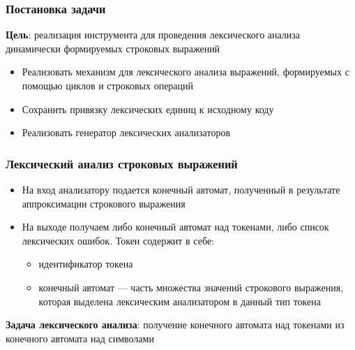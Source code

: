 \documentclass{beamer}
\begin{document}
\begin{frame}[fragile]
\transwipe[direction=90]
\frametitle{Постановка задачи}

\textbf{Цель}: реализация инструмента для проведения лексического анализа динамически формируемых строковых выражений

\begin{itemize}
\item Реализовать механизм для лексического анализа выражений, формируемых с помощью циклов и строковых операций%
\item Сохранить привязку лексических единиц к исходному коду
\item Реализовать генератор лексических анализаторов
\end{itemize}

\end{frame}

\begin{frame}
\transwipe[direction=90]
\frametitle{Лексический анализ строковых выражений}
\begin{itemize}
\item На вход анализатору подается конечный автомат, полученный в результате аппроксимации строкового выражения
\item На выходе получаем либо конечный автомат над токенами, либо список лексических ошибок. Токен содержит в себе:
	\begin{itemize}
	\item идентификатор токена
	\item конечный автомат --- часть множества значений строкового выражения, которая выделена лексическим анализатором в данный тип токена
	\end{itemize}
\end{itemize}

\begin{block}{}
\textbf{Задача лексического анализа}: получение конечного автомата над токенами из конечного автомата над символами
\end{block}

\end{frame}
\end{document}
